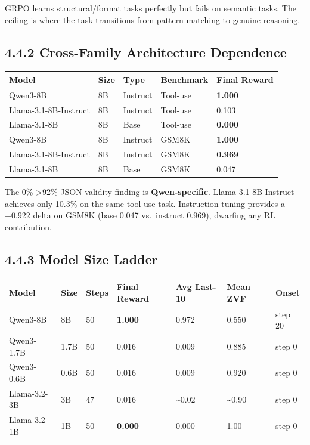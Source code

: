 \documentclass[
  american,
  11pt,
  a4paper,
  oneside]{report}
\newcounter{none} %
\begin{document}
GRPO learns structural/format tasks perfectly but fails on semantic
tasks. The ceiling is where the task transitions from pattern-matching
to genuine reasoning.

\subsection{4.4.2 Cross-Family Architecture
Dependence}\label{cross-family-architecture-dependence}

{\def\LTcaptype{none} %
\begin{longtable}[]{@{}lllll@{}}
\toprule\noalign{}
Model & Size & Type & Benchmark & Final Reward \\
\midrule\noalign{}
\endhead
\bottomrule\noalign{}
\endlastfoot
Qwen3-8B & 8B & Instruct & Tool-use & \textbf{1.000} \\
Llama-3.1-8B-Instruct & 8B & Instruct & Tool-use & 0.103 \\
Llama-3.1-8B & 8B & Base & Tool-use & \textbf{0.000} \\
Qwen3-8B & 8B & Instruct & GSM8K & \textbf{1.000} \\
Llama-3.1-8B-Instruct & 8B & Instruct & GSM8K & \textbf{0.969} \\
Llama-3.1-8B & 8B & Base & GSM8K & 0.047 \\
\end{longtable}
}

The 0\%-\textgreater92\% JSON validity finding is
\textbf{Qwen-specific}. Llama-3.1-8B-Instruct achieves only 10.3\% on
the same tool-use task. Instruction tuning provides a +0.922 delta on
GSM8K (base 0.047 vs.~instruct 0.969), dwarfing any RL contribution.

\subsection{4.4.3 Model Size Ladder}\label{model-size-ladder}

{\def\LTcaptype{none} %
\begin{longtable}[]{@{}lllllll@{}}
\toprule\noalign{}
Model & Size & Steps & Final Reward & Avg Last-10 & Mean ZVF & Onset \\
\midrule\noalign{}
\endhead
\bottomrule\noalign{}
\endlastfoot
Qwen3-8B & 8B & 50 & \textbf{1.000} & 0.972 & 0.550 & step 20 \\
Qwen3-1.7B & 1.7B & 50 & 0.016 & 0.009 & 0.885 & step 0 \\
Qwen3-0.6B & 0.6B & 50 & 0.016 & 0.009 & 0.920 & step 0 \\
Llama-3.2-3B & 3B & 47 & 0.016 & \textasciitilde0.02 &
\textasciitilde0.90 & step 0 \\
Llama-3.2-1B & 1B & 50 & \textbf{0.000} & 0.000 & 1.00 & step 0 \\
\end{longtable}
}
\end{document}

